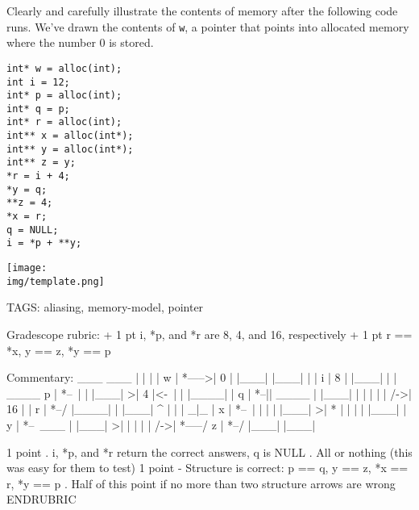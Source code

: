 \clearpage
{}

Clearly and carefully illustrate the contents of memory after the
following code runs. We've drawn the contents of \lstinline'w', a pointer
that points into allocated memory where the number 0 is stored.

\smallskip
\begin{lstlisting}
int* w = alloc(int);
int i = 12;
int* p = alloc(int);
int* q = p;
int* r = alloc(int);
int** x = alloc(int*);
int** y = alloc(int*);
int** z = y;
*r = i + 4;
*y = q;
**z = 4;
*x = r;
q = NULL;
i = *p + **y;
\end{lstlisting}

\begin{framed}
\else
  \texttt{[image: \\img/template.png]}
\fi
\end{framed}

\RUBRIC
TAGS: aliasing, memory-model, pointer

Gradescope rubric:
+ 1 pt i, *p, and *r are 8, 4, and 16, respectively
+ 1 pt r == *x, y == z, *y == p

Commentary:
    ___      ___
   |   |    |   |
 w | *----->| 0 |
   |___|    |___|
   |   |
 i | 8 |
   |___|
   |   |     ____
 p | *--\   |    |
   |___| \->| 4  |<-\
   |   |    |____|   |
 q | *--||   ____    |
   |___|    |    |   |
   |   | /->| 16 |   |
 r | *--/   |____|   |
   |___|      ^      |
   |   |     _|_     |
 x | *--\   | | |    |
   |___| \->| * |    |
   |   |    |___|    |
 y | *--\    ___     |
   |___| \->|   |    |
   |   | /->| *-----/
 z | *--/   |___|
   |___|

1 point
  . i, *p, and *r return the correct answers, q is NULL
  . All or nothing (this was easy for them to test)
1 point - Structure is correct: p == q, y == z, *x == r, *y == p
  . Half of this point if no more than two structure arrows are wrong
ENDRUBRIC
